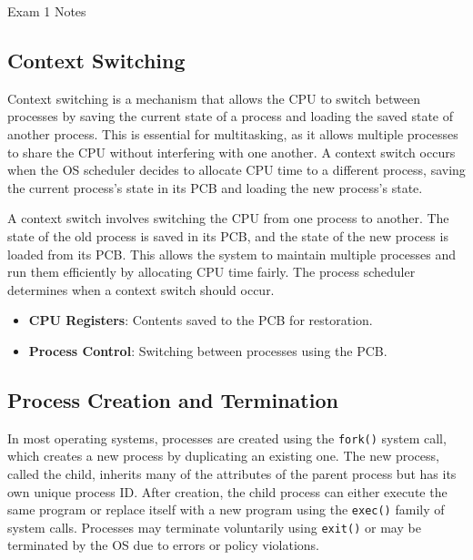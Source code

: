 \begin{examnotes}{Exam 1 Notes}
    \subsection*{Context Switching}
    
    Context switching is a mechanism that allows the CPU to switch between processes by saving the current state of a process and loading the saved state of another process. This is essential for 
    multitasking, as it allows multiple processes to share the CPU without interfering with one another. A context switch occurs when the OS scheduler decides to allocate CPU time to a different 
    process, saving the current process's state in its PCB and loading the new process's state.
    
    \begin{highlight}
        A context switch involves switching the CPU from one process to another. The state of the old process is saved in its PCB, and the state of the new process is loaded from its PCB. This allows 
        the system to maintain multiple processes and run them efficiently by allocating CPU time fairly. The process scheduler determines when a context switch should occur.
        \begin{itemize}
            \item \textbf{CPU Registers}: Contents saved to the PCB for restoration.
            \item \textbf{Process Control}: Switching between processes using the PCB.
        \end{itemize}
    \end{highlight}
    
    \subsection*{Process Creation and Termination}
    
    In most operating systems, processes are created using the \texttt{fork()} system call, which creates a new process by duplicating an existing one. The new process, called the child, inherits many 
    of the attributes of the parent process but has its own unique process ID. After creation, the child process can either execute the same program or replace itself with a new program using the 
    \texttt{exec()} family of system calls. Processes may terminate voluntarily using \texttt{exit()} or may be terminated by the OS due to errors or policy violations.
    

\end{examnotes}
